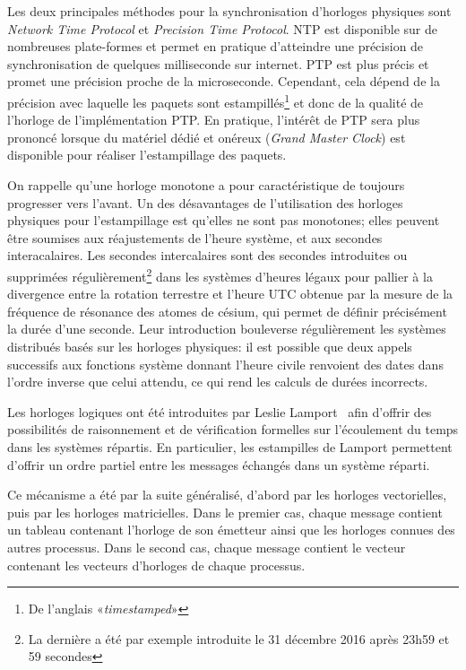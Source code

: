 \documentclass[10pt]{article}
\begin{document}
Les deux principales méthodes pour la synchronisation d'horloges physiques sont \emph{Network Time Protocol}\cite{mills1991internet} et \emph{Precision Time Protocol}\cite{peng2009research}. 
NTP est disponible sur de nombreuses plate-formes et permet en pratique d'atteindre une précision de synchronisation de quelques milliseconde sur internet. 
PTP est plus précis et promet une précision proche de la microseconde. 
Cependant, cela dépend de la précision avec laquelle les paquets sont estampillés\footnote{De l'anglais «\textit{timestamped}»} et donc de la qualité de l'horloge de l'implémentation PTP. 
En pratique, l'intérêt de PTP sera plus prononcé lorsque du matériel dédié et onéreux (\emph{Grand Master Clock}) est disponible pour réaliser l'estampillage des paquets.

On rappelle qu'une horloge monotone a pour caractéristique de toujours progresser vers l'avant. 
Un des désavantages de l'utilisation des horloges physiques pour l'estampillage est qu'elles ne sont pas monotones; elles peuvent être soumises aux réajustements de l'heure système, et aux secondes interacalaires. 
Les secondes intercalaires sont des secondes introduites ou supprimées régulièrement\footnote{La dernière a été par exemple introduite le 31 décembre 2016 après 23h59 et 59 secondes} dans les systèmes d'heures légaux pour pallier à la divergence entre la rotation terrestre et l'heure UTC obtenue par la mesure de la fréquence de résonance des atomes de césium, qui permet de définir précisément la durée d'une seconde. 
Leur introduction bouleverse régulièrement les systèmes distribués basés sur les horloges physiques: il est possible que deux appels successifs aux fonctions système donnant l'heure civile renvoient des dates dans l'ordre inverse que celui attendu, ce qui rend les calculs de durées incorrects.

Les horloges logiques ont été introduites par Leslie Lamport~\cite{lamport1978time} afin d'offrir des possibilités de raisonnement et de vérification formelles sur l'écoulement du temps dans les systèmes répartis.
En particulier, les estampilles de Lamport permettent d'offrir un ordre partiel entre les messages échangés dans un système réparti.

Ce mécanisme a été par la suite généralisé, d'abord par les horloges vectorielles, puis par les horloges matricielles. 
Dans le premier cas, chaque message contient un tableau contenant l'horloge de son émetteur ainsi que les horloges connues des autres processus. Dans le second cas, chaque message contient le vecteur contenant les vecteurs d'horloges de chaque processus.
\end{document}

